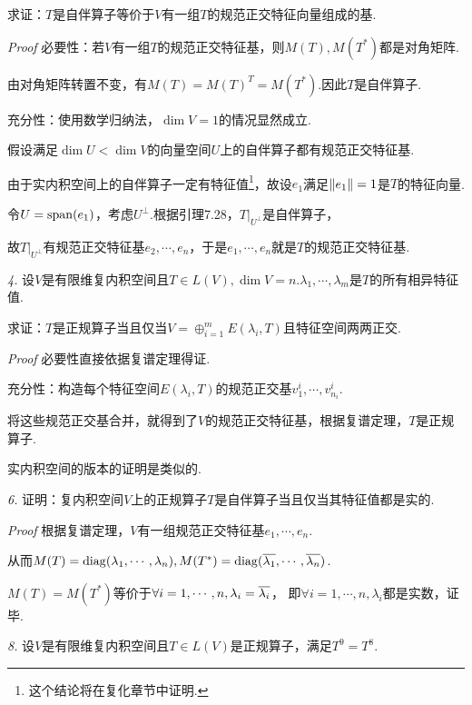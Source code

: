 求证：\(T\)是自伴算子等价于\(V\)有一组\(T\)的规范正交特征向量组成的基.

\textit{Proof}
必要性：若\(V\)有一组\(T\)的规范正交特征基，则\(M(T),M(T^*)\)都是对角矩阵.

由对角矩阵转置不变，有\(M(T)=M(T)^T=M(T^*)\).因此\(T\)是自伴算子.

充分性：使用数学归纳法，\(\dim V=1\)的情况显然成立.

假设满足\(\dim U<\dim V\)的向量空间\(U\)上的自伴算子都有规范正交特征基.

由于实内积空间上的自伴算子一定有特征值\footnote{这个结论将在复化章节中证明.}，故设\(e_1\)满足\(\left\lVert e_1 \right\rVert=1\)是\(T\)的特征向量.

令\(U=\mathrm{span}(e_1)\)，考虑\(U^\bot\).根据引理7.28，\(T|_{U^\bot}\)是自伴算子，

故\(T|_{U^\bot}\)有规范正交特征基\(e_2,\cdots,e_n\)，于是\(e_1,\cdots,e_n\)就是\(T\)的规范正交特征基.

\newpage

\textit{4.}
设\(V\)是有限维复内积空间且\(T \in L(V),\dim V=n\).\(\lambda_1,\cdots,\lambda_m\)是\(T\)的所有相异特征值.

求证：\(T\)是正规算子当且仅当\(V=\oplus_{i=1}^m E(\lambda_i,T)\)且特征空间两两正交.

\textit{Proof}
必要性直接依据复谱定理得证.

充分性：构造每个特征空间\(E(\lambda_i,T)\)的规范正交基\(v_1^i,\cdots,v_{n_i}^i\).

将这些规范正交基合并，就得到了\(V\)的规范正交特征基，根据复谱定理，\(T\)是正规算子.

实内积空间的版本的证明是类似的.

\hspace*{\fill}

\textit{6.}
证明：复内积空间\(V\)上的正规算子\(T\)是自伴算子当且仅当其特征值都是实的.

\textit{Proof}
根据复谱定理，\(V\)有一组规范正交特征基\(e_1,\cdots,e_n\).

从而\(M(T)=\mathrm{diag}(\lambda_1,\cdots,\lambda_n),M(T^*)=\mathrm{diag}(\overline{\lambda_1},\cdots,\overline{\lambda_n})\).

\(M(T)=M(T^*)\)等价于\(\forall i=1,\cdots,n,\lambda_i=\overline{\lambda_i}\)，
即\(\forall i=1,\cdots,n,\lambda_i\)都是实数，证毕.

\hspace*{\fill}

\textit{8.}
设\(V\)是有限维复内积空间且\(T \in L(V)\)是正规算子，满足\(T^9=T^8\).

